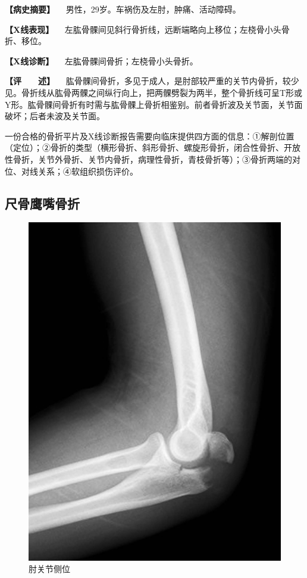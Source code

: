\textbf{【病史摘要】} 　男性，29岁。车祸伤及左肘，肿痛、活动障碍。

\textbf{【X线表现】}
　左肱骨髁间见斜行骨折线，远断端略向上移位；左桡骨小头骨折、移位。

\textbf{【X线诊断】} 　左肱骨髁间骨折；左桡骨小头骨折。

\textbf{【评　　述】}
　肱骨髁间骨折，多见于成人，是肘部较严重的关节内骨折，较少见。骨折线从肱骨两髁之间纵行向上，把两髁劈裂为两半，整个骨折线可呈T形或Y形。肱骨髁间骨折有时需与肱骨髁上骨折相鉴别。前者骨折波及关节面，关节面破坏；后者未波及关节面。

一份合格的骨折平片及X线诊断报告需要向临床提供四方面的信息：①解剖位置（定位）；②骨折的类型（横形骨折、斜形骨折、螺旋形骨折，闭合性骨折、开放性骨折，关节外骨折、关节内骨折，病理性骨折，青枝骨折等）；③骨折两端的对位、对线关系；④软组织损伤评价。

\subsection{尺骨鹰嘴骨折}

\begin{figure}[!htbp]
 \centering
 \includegraphics{./images/Image00033.jpg}
 \captionsetup{justification=centering}
 \caption{肘关节侧位}
 \label{fig2-3-6}
  \end{figure} 

